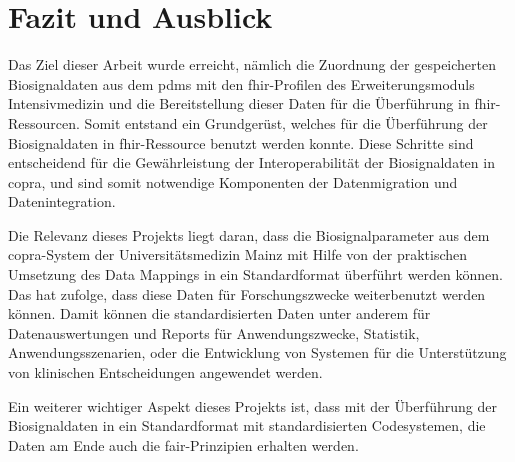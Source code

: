 \chapter{Fazit und Ausblick} \label{ch:conclussion}

Das Ziel dieser Arbeit wurde erreicht, nämlich die Zuordnung der gespeicherten Biosignaldaten aus dem \ac{pdms} mit den \ac{fhir}-Profilen des Erweiterungsmoduls \glqq Intensivmedizin\grqq{} und die Bereitstellung dieser Daten für die Überführung in \ac{fhir}-Ressourcen. Somit entstand ein Grundgerüst, welches für die Überführung der Biosignaldaten in \ac{fhir}-Ressource benutzt werden konnte. Diese Schritte sind entscheidend für die Gewährleistung der Interoperabilität der Biosignaldaten in \ac{copra}, und sind somit notwendige Komponenten der Datenmigration und Datenintegration.

Die Relevanz dieses Projekts liegt daran, dass die Biosignalparameter aus dem \ac{copra}-System der Universitätsmedizin Mainz mit Hilfe von der praktischen Umsetzung des Data Mappings in ein Standardformat überführt werden können. Das hat zufolge, dass diese Daten für Forschungszwecke weiterbenutzt werden können. Damit können die standardisierten Daten unter anderem für Datenauswertungen und Reports für Anwendungszwecke, Statistik, Anwendungsszenarien, oder die Entwicklung von Systemen für die Unterstützung von klinischen Entscheidungen angewendet werden.

Ein weiterer wichtiger Aspekt dieses Projekts ist, dass mit der Überführung der Biosignaldaten in ein Standardformat mit standardisierten Codesystemen, die Daten am Ende auch die \ac{fair}-Prinzipien erhalten werden.
